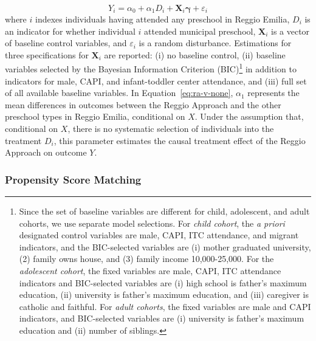 \begin{equation}
	Y_i = \alpha_0 + \alpha_1 D_i + \bm{X}_i \bm{\gamma} + \varepsilon_i
	\label{eq:ra-v-none}
\end{equation}
where $i$ indexes individuals having attended any preschool in Reggio Emilia, $D_i$ is an indicator for whether individual $i$ attended municipal preschool, $\bm{X}_i$ is a vector of baseline control variables, and $\varepsilon_i$ is a random disturbance. Estimations for three specifications for $\bm{X}_i$ are reported: (i) no baseline control, (ii) baseline variables selected by the Bayesian Information Criterion (BIC)\footnote{Since the set of baseline variables are different for child, adolescent, and adult cohorts, we use separate model selections. For \emph{child cohort}, the \emph{a priori} designated control variables are male, CAPI, ITC attendance, and migrant indicators, and the BIC-selected variables are (i) mother graduated university, (2) family owns house, and (3) family income 10,000-25,000. For the \emph{adolescent cohort}, the fixed variables are male, CAPI, ITC attendance indicators and BIC-selected variables are (i) high school is father's maximum education, (ii) university is father's maximum education, and (iii) caregiver is catholic and faithful. For \emph{adult cohorts}, the fixed variables are male and CAPI indicators, and BIC-selected variables are (i) university is father's maximum education and (ii) number of siblings.} in addition to indicators for male, CAPI, and infant-toddler center attendance, and (iii) full set of all available baseline variables. In Equation~\ref{eq:ra-v-none}, $\alpha_1$ represents the mean differences in outcomes between the Reggio Approach and the other preschool types in Reggio Emilia, conditional on $X$. Under the assumption that, conditional on $X$, there is no systematic selection of individuals into the treatment $D_i$, this parameter estimates the causal treatment effect of the Reggio Approach on outcome $Y$.

\subsubsection{Propensity Score Matching}  \label{subsubsection:psm}

